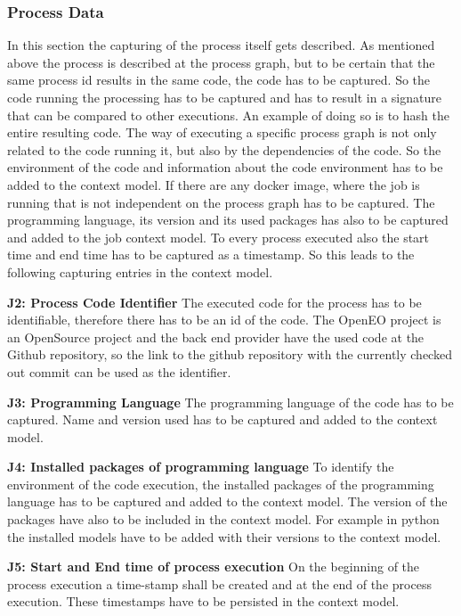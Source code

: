 \documentclass[draft,final]{vutinfth} %
\begin{document}
\subsubsection{Process Data}\label{Job:Process Data}
In this section the capturing of the process itself gets described. As mentioned above the process is described at the process graph, but to be certain that the same process id results in the same code, the code has to be captured. So the code running the processing has to be captured and has to result in a signature that can be compared to other executions. An example of doing so is to hash the entire resulting code. 
The way of executing a specific process graph is not only related to the code running it, but also by the dependencies of the code. So the environment of the code and information about the code environment has to be added to the context model. If there are any docker image, where the job is running that is not independent on the process graph has to be captured. The programming language, its version and its used packages has also to be captured and added to the job context model. To every process executed also the start time and end time has to be captured as a timestamp. So this leads to the following capturing entries in the context model.

\textbf{J2: Process Code Identifier}
The executed  code for the process has to be identifiable, therefore there has to be an id of the code. The OpenEO project is an OpenSource project and the back end provider have the used code at the Github repository, so the link to the github repository with the currently checked out commit can be used as the identifier. 

\textbf{J3: Programming Language}
The programming language of the code has to be captured. Name and version used has to be captured and added to the context model.

\textbf{J4: Installed packages of programming language}
To identify the environment of the code execution, the installed packages of the programming language has to be captured and added to the context model. The version of the packages have also to be included in the context model. For example in python the installed models have to be added with their versions to the context model.

\textbf{J5: Start and End time of process execution}
On the beginning of the process execution a time-stamp shall  be created and at the end of the process execution. These timestamps have to be persisted in the context model.
\end{document}
